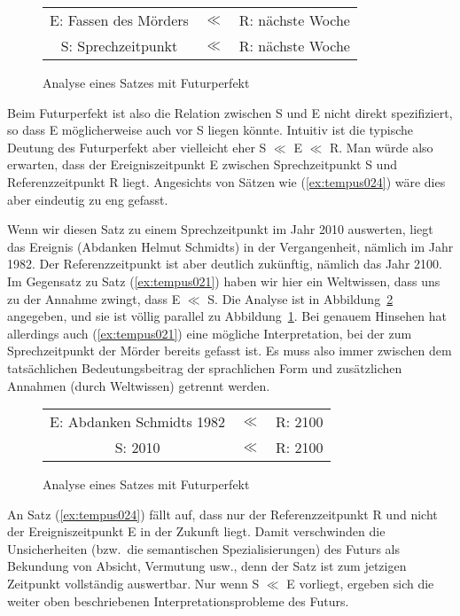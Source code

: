 \begin{figure}[!htbp]
  \centering
  \begin{tabular}{ccc}
    E: Fassen des Mörders & $\ll$ & R: nächste Woche \\
    S: Sprechzeitpunkt & $\ll$ & R: nächste Woche \\
  \end{tabular}
  \caption{Analyse eines Satzes mit Futurperfekt}
  \label{fig:tempus023}
\end{figure}

Beim Futurperfekt ist also die Relation zwischen S und E nicht direkt spezifiziert, so dass E möglicherweise auch vor S liegen könnte.
Intuitiv ist die typische Deutung des Futurperfekt aber vielleicht eher S $\ll$ E $\ll$ R.
Man würde also erwarten, dass der Ereigniszeitpunkt E zwischen Sprechzeitpunkt S und Referenzzeitpunkt R liegt.
Angesichts von Sätzen wie (\ref{ex:tempus024}) wäre dies aber eindeutig zu eng gefasst.

\begin{exe}
\end{exe}

Wenn wir diesen Satz zu einem Sprechzeitpunkt im Jahr 2010 auswerten, liegt das Ereignis (Abdanken Helmut Schmidts) in der Vergangenheit, nämlich im Jahr 1982.
Der Referenzzeitpunkt ist aber deutlich zukünftig, nämlich das Jahr 2100.
Im Gegensatz zu Satz (\ref{ex:tempus021}) haben wir hier ein Weltwissen, dass uns zu der Annahme zwingt, dass E $\ll$ S.
Die Analyse ist in Abbildung~\ref{fig:tempus025} angegeben, und sie ist völlig parallel zu Abbildung~\ref{fig:tempus023}.
Bei genauem Hinsehen hat allerdings auch (\ref{ex:tempus021}) eine mögliche Interpretation, bei der zum Sprechzeitpunkt der Mörder bereits gefasst ist.
Es muss also immer zwischen dem tatsächlichen Bedeutungsbeitrag der sprachlichen Form und zusätzlichen Annahmen (\zB durch Weltwissen) getrennt werden.

\begin{figure}[!htbp]
  \centering
  \begin{tabular}{ccc}
    E: Abdanken Schmidts 1982 & $\ll$ & R: 2100 \\
    S: 2010 & $\ll$ & R: 2100 \\
  \end{tabular}
  \caption{Analyse eines Satzes mit Futurperfekt}
  \label{fig:tempus025}
\end{figure}

An Satz (\ref{ex:tempus024}) fällt auf, dass nur der Referenzzeitpunkt R und nicht der Ereigniszeitpunkt E in der Zukunft liegt.
Damit verschwinden die Unsicherheiten (bzw.\ die semantischen Spezialisierungen) des Futurs als Bekundung von Absicht, Vermutung usw., denn der Satz ist zum jetzigen Zeitpunkt vollständig auswertbar.
Nur wenn S $\ll$ E vorliegt, ergeben sich die weiter oben beschriebenen Interpretationsprobleme des Futurs.

